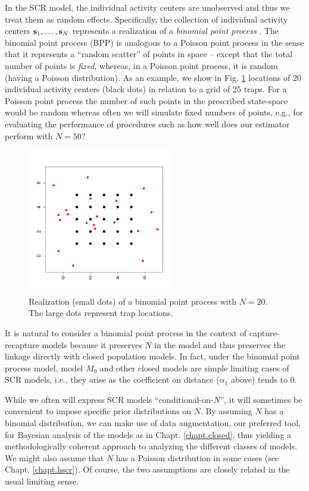 In the SCR model, the individual activity centers are unobserved and thus we
treat them as random effects. Specifically,
the collection of individual activity centers ${\bf s}_{1},\ldots,
{\bf s}_{N}$ represents a realization of a {\it binomial point process}
\citep[][p. 61]{illian_etal:2008}.  The binomial point process (BPP)
is analogous to a Poisson point process in the sense that it
represents a ``random scatter'' of points in space -- except that the
total number of points is {\it fixed}, whereas, in a Poisson point
process, it is random (having a Poisson distribution).  As an example,
we show in Fig. \ref{scr0.fig.bpp} locations of 20 individual activity
centers (black dots) in relation to a grid of 25 traps. For a Poisson
point process the number of such points in the prescribed state-space
would be random whereas often we will simulate fixed numbers of
points, e.g., for evaluating the performance of procedures such as how
well does our estimator perform with $N=50$?
\begin{figure}[ht]
\begin{center}
\includegraphics[height=2.5in]{Ch5-SCR0/figs/binomialpoint}
\end{center}
\caption{Realization (small dots) of a binomial point process with $N=20$. The
  large dots represent trap locations.
}
\label{scr0.fig.bpp}
\end{figure}

It is natural to consider a binomial point process in the context of
capture-recapture models because it preserves $N$ in the model and thus
preserves the linkage directly with closed population models. In fact,
under the binomial point process model, model $M_0$ and other closed
models are simple limiting cases of SCR models, i.e., they arise as the
coefficient on distance ($\alpha_1$ above) tends to 0.

While we often will express SCR models ``conditional-on-$N$'', it will
sometimes be convenient to impose specific prior distributions on
$N$. By assuming $N$ has a binomial distribution, we can make use of
data augmentation, our preferred tool, for Bayesian analysis of the
models as in Chapt. \ref{chapt.closed}, thus yielding a
methodologically coherent approach to analyzing the different classes
of models. We might also assume that $N$ has a Poisson distribution in
some cases (see Chapt. \ref{chapt.hscr}). Of course, the two
assumptions are closely related in the usual limiting sense.

